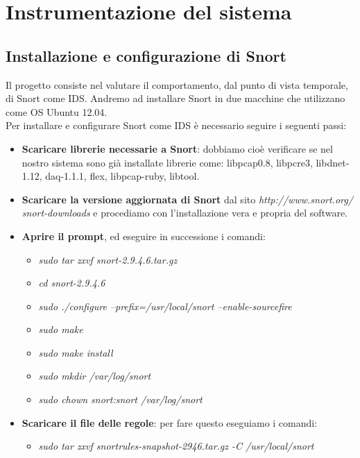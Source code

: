 
\chapter{Instrumentazione del sistema}
	
	\section{Installazione e configurazione di Snort}
		
		Il progetto consiste nel valutare il comportamento, dal punto di vista temporale, di Snort come IDS. Andremo ad installare Snort in due macchine che utilizzano come OS Ubuntu 12.04.\\
		Per installare e configurare Snort come IDS è necessario seguire i seguenti passi:
		\begin{itemize}
		  \item \textbf{Scaricare librerie necessarie a Snort}: dobbiamo cioè verificare se nel nostro sistema sono già installate librerie come: libpcap0.8, libpcre3, libdnet-1.12, daq-1.1.1, flex, libpcap-ruby, libtool.
		  \item \textbf{Scaricare la versione aggiornata di Snort} dal sito \textit{http://www.snort.org/\\ snort-downloads} e procediamo con l'installazione vera e propria del software.
		  \item \textbf{Aprire il prompt}, ed eseguire in successione i comandi:
		        \begin{itemize}
		            \item \textit{sudo tar zxvf snort-2.9.4.6.tar.gz}
		            \item \textit{cd snort-2.9.4.6}
		            \item \textit{sudo ./configure --prefix=/usr/local/snort --enable-sourcefire}
		            \item \textit{sudo make}
		            \item \textit{sudo make install}
		            \item \textit{sudo mkdir /var/log/snort}
		            \item \textit{sudo chown snort:snort /var/log/snort}
		        \end{itemize}
		  \item \textbf{Scaricare il file delle regole}: per fare questo eseguiamo i comandi:
		        \begin{itemize}
		            \item \textit{sudo tar zxvf snortrules-snapshot-2946.tar.gz -C /usr/local/snort}

\end{itemize}
\end{itemize}
